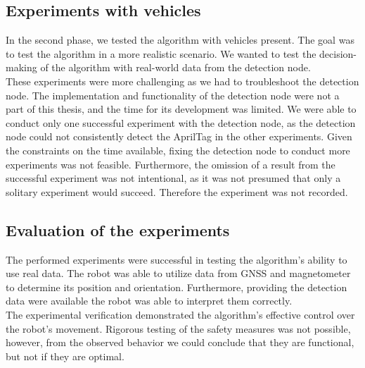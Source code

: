     \subsection{Experiments with vehicles}
        In the second phase, we tested the algorithm with vehicles present. The goal was to test the algorithm in a more realistic scenario. We wanted to test the decision-making of the algorithm with real-world data from the detection node.\\
        These experiments were more challenging as we had to troubleshoot the detection node. The implementation and functionality of the detection node were not a part of this thesis, and the time for its development was limited. We were able to conduct only one successful experiment with the detection node, as the detection node could not consistently detect the AprilTag in the other experiments. Given the constraints on the time available, fixing the detection node to conduct more experiments was not feasible. Furthermore, the omission of a result from the successful experiment was not intentional, as it was not presumed that only a solitary experiment would succeed. Therefore the experiment was not recorded.

    \subsection{Evaluation of the experiments}
        The performed experiments were successful in testing the algorithm's ability to use real data. The robot was able to utilize data from GNSS and magnetometer to determine its position and orientation. Furthermore, providing the detection data were available the robot was able to interpret them correctly.\\
        The experimental verification demonstrated the algorithm's effective control over the robot's movement. Rigorous testing of the safety measures was not possible, however, from the observed behavior we could conclude that they are functional, but not if they are optimal.
